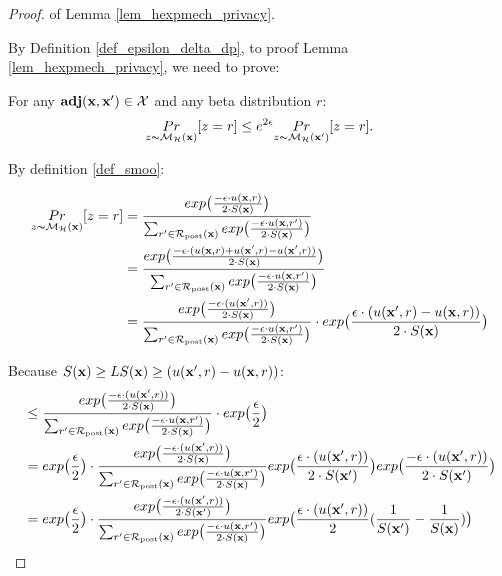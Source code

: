 \documentclass{article}
\begin{document}
\begin{proof} of Lemma \ref{lem_hexpmech_privacy}.

  By Definition \ref{def_epsilon_delta_dp}, to proof Lemma \ref{lem_hexpmech_privacy}, we need to prove:

  For any $\adj{\dataobs}{\dataobs'} \in \mathcal{X}$ and any beta distribution $r$:
  \begin{equation*}
  \hexpmechPr{\dataobs}{z = r} \leq e^{2\epsilon} \hexpmechPr{\dataobs'}{z = r}. 
  \end{equation*}

  By definition \ref{def_smoo}:

  \begin{equation*}
  \begin{split}
  \hexpmechPr{\dataobs}{z = r} 
  & = \frac {exp\big(\frac{-\epsilon\cdot\ux{r}}{2\cdot S(\dataobs)}\big)}{\unomalizer{\dataobs}} \\
  & = \frac {exp\big(
  \frac{-\epsilon\cdot(\ux{r} + \uxadj{r} - \uxadj{r})}{2\cdot S(\dataobs)}
  \big)}
  {\unomalizer{\dataobs}} \\
  & = \frac {exp\big(
  \frac{-\epsilon\cdot(\uxadj{r})}{2\cdot S(\dataobs)}
  \big)}
  {\unomalizer{\dataobs}}
  \cdot exp\big( \frac{\epsilon\cdot(\uxadj{r} - \ux{r})}{2\cdot S(\dataobs)} \big)\\
  \end{split}
  \end{equation*}

  Because $S(\dataobs) \geq LS(\dataobs) \geq (\uxadj{r} - \ux{r})$:
  \begin{equation*}
  \begin{split}
  & \leq \frac {exp\big(
  \frac{-\epsilon\cdot(\uxadj{r})}{2\cdot S(\dataobs)}
  \big)}
  {\unomalizer{\dataobs}}
  \cdot exp\big( \frac{\epsilon}{2} \big) \\
  & = exp\big( \frac{\epsilon}{2} \big) \cdot 
  \frac {
  exp
  \big(
  \frac{-\epsilon\cdot(\uxadj{r})}{2\cdot S(\dataobs)}
  \big)
  } 
  {\unomalizer{\dataobs}}
  exp
  \big(
  \frac{\epsilon\cdot(\uxadj{r})}{2\cdot S(\dataobs')}
  \big)
  exp
  \big(
  \frac{-\epsilon\cdot(\uxadj{r})}{2\cdot S(\dataobs')}
  \big)\\
  & = exp\big( \frac{\epsilon}{2} \big) \cdot 
  \frac {
  exp
  \big(
  \frac{-\epsilon\cdot(\uxadj{r})}{2\cdot S(\dataobs')}
  \big)
  } 
  {\unomalizer{\dataobs}}
  exp
  \big(
  \frac{\epsilon\cdot(\uxadj{r})}{2}(\frac{1}{S(\dataobs')} - \frac{1}{S(\dataobs)})
  \big)\\
  \end{split}
  \end{equation*}
  

\end{proof}
\end{document}
